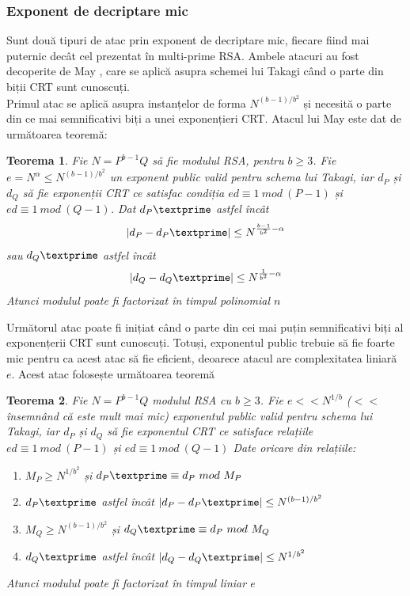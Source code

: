 \documentclass[12pt, oneside]{book}
\newtheorem{theorem}{Teorema}
\begin{document}
\subsubsection{Exponent de decriptare mic}
Sunt două tipuri de atac prin exponent de decriptare mic, fiecare fiind mai puternic decât cel prezentat în multi-prime RSA. Ambele atacuri au fost decoperite de May \cite{may}, care se aplică asupra schemei lui Takagi când o parte din biții CRT sunt cunoscuți. \\
Primul atac se aplică asupra instanțelor de forma $ N^{(b-1)/b^2}$ și necesită o parte din ce mai semnificativi biți a unei exponențieri CRT. Atacul lui May \cite{may} este dat de următoarea teoremă:
\begin{theorem}
Fie $N=P^{b-1}Q$ să fie modulul RSA, pentru $b \geqslant 3$. Fie $e= N^{\alpha} \leq N^{(b-1)/b^2}$ un exponent public valid pentru schema lui Takagi, iar $d_P$ și $d_Q$ să fie exponenții CRT ce satisfac condiția $ed \equiv 1 \ mod \ (P-1)$ și $ed \equiv 1 \ mod \ (Q-1)$. Dat $d_P \textprime$ astfel încât 
$$  \left| d_P - d_P \textprime \right| \leq N^{\frac{b-1}{b^2}- \alpha}  $$ 
sau $d_Q \textprime$ astfel încât 
$$ \left| d_Q - d_Q \textprime \right| \leq N^{\frac{1}{b^2}- \alpha} $$
Atunci modulul poate fi factorizat în timpul polinomial $n$
\end{theorem}
Următorul atac poate fi inițiat când o parte din cei mai puțin semnificativi biți al exponențerii CRT sunt cunoscuți. Totuși, exponentul public trebuie să fie foarte mic pentru ca acest atac să fie eficient, deoarece atacul are complexitatea liniară $e$. Acest atac folosește următoarea teoremă
\begin{theorem}
Fie $N=P^{b-1}Q$ modulul RSA cu $b \geqslant 3$. Fie $e << N^{1/b}$ ($<<$ însemnând că este mult mai mic) exponentul public valid pentru schema lui Takagi, iar $d_P$ și $d_Q$ să fie exponentul CRT ce satisface relațiile $ed \equiv 1 \ mod \ (P-1)$ și $ed \equiv 1 \ mod \ (Q-1)$ Date oricare din relațiile:
\begin{enumerate}
\item $  M_P \geqslant N^{1/b^2}$ și $d_P \textprime \equiv d_P \ mod \ M_P$
\item $d_P \textprime$ astfel încât $ \left| d_P - d_P \textprime \right| \leq N^{(b-1)/b^2}$
\item $M_Q \geqslant N^{(b-1)/b^2}$ și $d_Q \textprime \equiv d_P \ mod \ M_Q$
\item $d_Q \textprime$ astfel încât $ \left| d_Q - d_Q \textprime \right| \leq N^{1/b^2}$
\end{enumerate}
Atunci modulul poate fi factorizat în timpul liniar $e$
\end{theorem}
\end{document}
